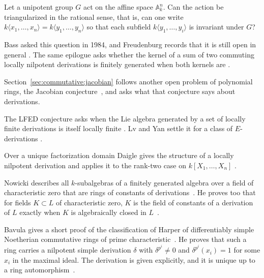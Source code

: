 \begin{problem}\label{prob:open:bass}
Let a unipotent group $G$ act on the affine space $\mathbb{A}^n_k$.
Can the action be triangularized in the rational sense, that is, can one write
$k\langle x_1,\dots,x_n\rangle=k\langle y_1,\dots,y_n\rangle$ so that each
subfield $k\langle y_1,\dots,y_i\rangle$ is invariant under $G$?
\end{problem}

Bass asked this question in 1984, and Freudenburg records that it is still
open in general \cite[p.~288]{Freudenburg2017}. The same epilogue asks whether
the kernel of a sum of two commuting locally nilpotent derivations is finitely
generated when both kernels are \cite[Question~11.11,
p.~291]{Freudenburg2017}.

Section~\ref{sec:commutative:jacobian} follows another open problem of
polynomial rings, the Jacobian
conjecture~\cite[p.~91]{VanEssenKurodaKoenig2021}, and asks what that
conjecture says about derivations.

The LFED conjecture asks when the Lie algebra generated by a set of locally
finite derivations is itself locally finite \cite[Abstract,
p.~1]{LvYan2020LFED}. Lv and Yan settle it for a class of $E$-derivations
\cite[Abstract, p.~1]{LvYan2020LFED}.

Over a unique factorization domain Daigle gives the structure of a locally
nilpotent derivation and applies it to the rank-two case on $k[X_1,\dots,X_n]$
\cite[pp.~353--371]{Daigle1998LNDUFD}.

Nowicki describes all $k$-subalgebras of a finitely generated algebra over a
field of characteristic zero that are rings of constants of derivations~\cite{WlRingsAndFieldsOfConstantsForDe1994}. He
proves too that for fields $K\subset L$ of characteristic zero, $K$ is the field
of constants of a derivation of $L$ exactly when $K$ is algebraically closed
in $L$~\cite{WlRingsAndFieldsOfConstantsForDe1994}.

Bavula gives a short proof of the classification of Harper of differentiably simple
Noetherian commutative rings of prime characteristic~\cite{WlSimpleDerivationsOfDifferentia2008}. He proves that such a
ring carries a nilpotent simple derivation $\delta$ with $\delta^{p^i}\neq 0$
and $\delta^{p^i}(x_i)=1$ for some $x_i$ in the maximal ideal. The derivation
is given explicitly, and it is unique up to a ring
automorphism~\cite{WlSimpleDerivationsOfDifferentia2008}.

